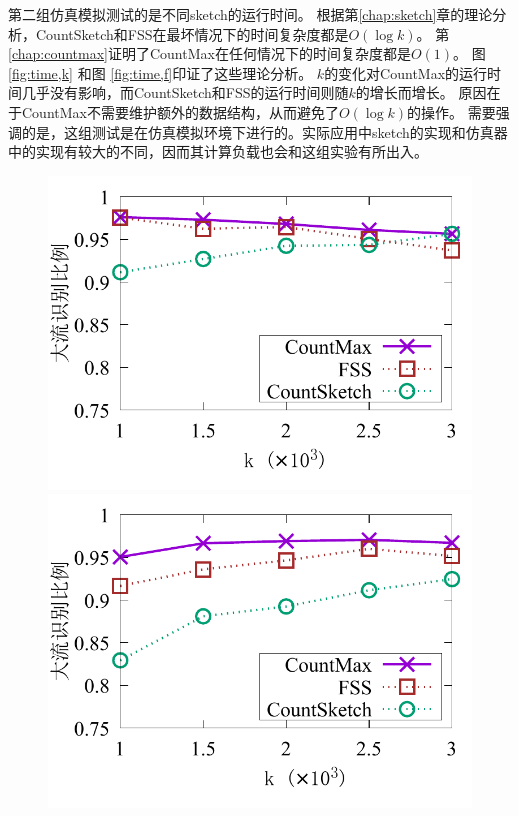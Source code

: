 第二组仿真模拟测试的是不同sketch的运行时间。
根据第\ref{chap:sketch}章的理论分析，CountSketch和FSS在最坏情况下的时间复杂度都是$O(\log{k})$。
第\ref{chap:countmax}证明了CountMax在任何情况下的时间复杂度都是$O(1)$。
图 \ref{fig:time,k} 和图 \ref{fig:time,f}印证了这些理论分析。
$k$的变化对CountMax的运行时间几乎没有影响，而CountSketch和FSS的运行时间则随$k$的增长而增长。
原因在于CountMax不需要维护额外的数据结构，从而避免了$O(\log{k})$的操作。
需要强调的是，这组测试是在仿真模拟环境下进行的。实际应用中sketch的实现和仿真器中的实现有较大的不同，因而其计算负载也会和这组实验有所出入。

\begin{figure}[ht]
	\centering
	\begin{minipage}[t]{0.49\linewidth}
		\centering
		\includegraphics[width=\linewidth]{fig/ft_k_hit_200000.pdf}
	\end{minipage}\vspace{-0.6em}%
	\begin{minipage}[t]{0.49\linewidth}
		\centering
		\includegraphics[width=\linewidth]{fig/hy_k_hit_200000.pdf}

\end{minipage}
\end{figure}
